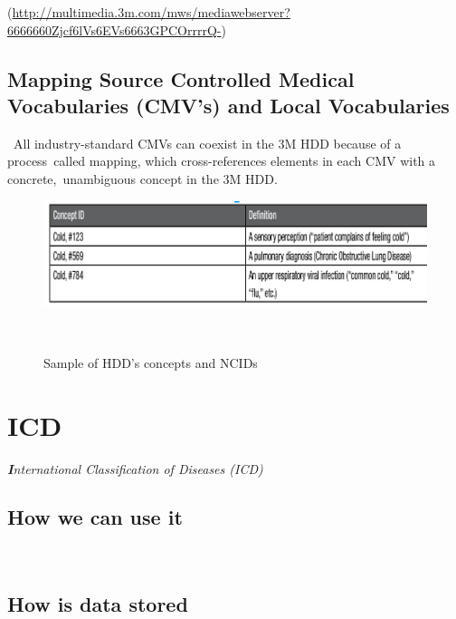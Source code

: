 \documentclass[DIV=calc, paper=a4, fontsize=12pt, onecolumn]{scrartcl}	 %
\newcommand{\initial}[1]{ %
\lettrine[lines=3,lhang=0.3,nindent=0em,slope=0em]{
\color{DarkBlue}
{\textbf{\textit{#1}}}}{}}
\begin{document}
 (\url{http://multimedia.3m.com/mws/mediawebserver?6666660Zjcf6lVs6EVs6663GPCOrrrrQ-})\

  \subsection{Mapping Source Controlled Medical Vocabularies (CMV's) and Local Vocabularies}\
  All industry-standard CMVs can coexist in the 3M HDD because of a process\
  called mapping, which cross-references elements in each CMV with a concrete,\
  unambiguous concept in the 3M HDD.\\

  \begin{figure}[ht!]
    \label{fig:cid}
    \centering
    \includegraphics[scale=0.4]{conceptid.png}
    \caption{Sample of HDD's concepts and NCIDs}\
  \end{figure}  



  \section[International Classification of Diseases (ICD) ]{ICD}
  \label{sec:icd}

  \initial{I}\textit{nternational Classification of Diseases (ICD)}\\

  \subsection{How we can use it}\


  \subsection{How is data stored}\

\end{document}
